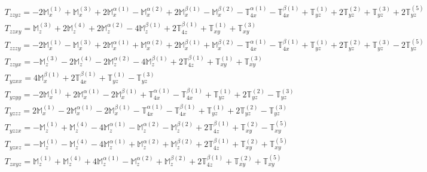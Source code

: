 \documentclass[fleqn,8pt,landscape]{jsarticle}
\begin{document}
\begin{align*}
& T_{zzyz} = - 2 \mathbb{M}_{x}^{(1)} + \mathbb{M}_{x}^{(3)} + 2 \mathbb{M}_{x}^{\alpha(1)} - \mathbb{M}_{x}^{\alpha(2)} + 2 \mathbb{M}_{x}^{\beta(1)} - \mathbb{M}_{x}^{\beta(2)} - \mathbb{T}_{4x}^{\alpha(1)} - \mathbb{T}_{4x}^{\beta(1)} + \mathbb{T}_{yz}^{(1)} + 2 \mathbb{T}_{yz}^{(2)} + \mathbb{T}_{yz}^{(3)} + 2 \mathbb{T}_{yz}^{(5)} \\
& T_{zzxy} = \mathbb{M}_{z}^{(3)} + 2 \mathbb{M}_{z}^{(4)} + 2 \mathbb{M}_{z}^{\alpha(2)} - 4 \mathbb{M}_{z}^{\beta(1)} + 2 \mathbb{T}_{4z}^{\beta(1)} + \mathbb{T}_{xy}^{(1)} + \mathbb{T}_{xy}^{(3)} \\
& T_{zzzy} = - 2 \mathbb{M}_{x}^{(1)} - \mathbb{M}_{x}^{(3)} + 2 \mathbb{M}_{x}^{\alpha(1)} + \mathbb{M}_{x}^{\alpha(2)} + 2 \mathbb{M}_{x}^{\beta(1)} + \mathbb{M}_{x}^{\beta(2)} - \mathbb{T}_{4x}^{\alpha(1)} - \mathbb{T}_{4x}^{\beta(1)} + \mathbb{T}_{yz}^{(1)} + 2 \mathbb{T}_{yz}^{(2)} + \mathbb{T}_{yz}^{(3)} - 2 \mathbb{T}_{yz}^{(5)} \\
& T_{zzyx} = - \mathbb{M}_{z}^{(3)} - 2 \mathbb{M}_{z}^{(4)} - 2 \mathbb{M}_{z}^{\alpha(2)} - 4 \mathbb{M}_{z}^{\beta(1)} + 2 \mathbb{T}_{4z}^{\beta(1)} + \mathbb{T}_{xy}^{(1)} + \mathbb{T}_{xy}^{(3)} \\
& T_{yzxx} = 4 \mathbb{M}_{x}^{\beta(1)} + 2 \mathbb{T}_{4x}^{\beta(1)} + \mathbb{T}_{yz}^{(1)} - \mathbb{T}_{yz}^{(3)} \\
& T_{yzyy} = - 2 \mathbb{M}_{x}^{(1)} + 2 \mathbb{M}_{x}^{\alpha(1)} - 2 \mathbb{M}_{x}^{\beta(1)} + \mathbb{T}_{4x}^{\alpha(1)} - \mathbb{T}_{4x}^{\beta(1)} + \mathbb{T}_{yz}^{(1)} + 2 \mathbb{T}_{yz}^{(2)} - \mathbb{T}_{yz}^{(3)} \\
& T_{yzzz} = 2 \mathbb{M}_{x}^{(1)} - 2 \mathbb{M}_{x}^{\alpha(1)} - 2 \mathbb{M}_{x}^{\beta(1)} - \mathbb{T}_{4x}^{\alpha(1)} - \mathbb{T}_{4x}^{\beta(1)} + \mathbb{T}_{yz}^{(1)} + 2 \mathbb{T}_{yz}^{(2)} - \mathbb{T}_{yz}^{(3)} \\
& T_{yzzx} = - \mathbb{M}_{z}^{(1)} + \mathbb{M}_{z}^{(4)} - 4 \mathbb{M}_{z}^{\alpha(1)} - \mathbb{M}_{z}^{\alpha(2)} - \mathbb{M}_{z}^{\beta(2)} + 2 \mathbb{T}_{4z}^{\beta(1)} + \mathbb{T}_{xy}^{(2)} - \mathbb{T}_{xy}^{(5)} \\
& T_{yzxz} = - \mathbb{M}_{z}^{(1)} - \mathbb{M}_{z}^{(4)} - 4 \mathbb{M}_{z}^{\alpha(1)} + \mathbb{M}_{z}^{\alpha(2)} + \mathbb{M}_{z}^{\beta(2)} + 2 \mathbb{T}_{4z}^{\beta(1)} + \mathbb{T}_{xy}^{(2)} + \mathbb{T}_{xy}^{(5)} \\
& T_{zxyz} = \mathbb{M}_{z}^{(1)} + \mathbb{M}_{z}^{(4)} + 4 \mathbb{M}_{z}^{\alpha(1)} - \mathbb{M}_{z}^{\alpha(2)} + \mathbb{M}_{z}^{\beta(2)} + 2 \mathbb{T}_{4z}^{\beta(1)} + \mathbb{T}_{xy}^{(2)} + \mathbb{T}_{xy}^{(5)} \\

\end{align*}
\end{document}
